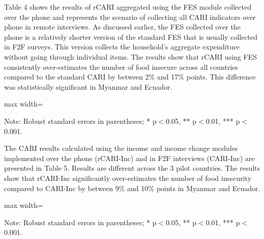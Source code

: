 \documentclass[11pt,harvard]{article}
\begin{document}
Table 4 shows the results of rCARI aggregated using the FES module collected over the phone and represents the scenario of collecting all CARI indicators over phone in remote interviews. As discussed earlier, the FES collected over the phone is a relatively shorter version of the standard FES that is usually collected in F2F surveys. This version collects the household's aggregate expenditure without going through individual items. 
The results show that rCARI using FES consistently over-estimates the number of food insecure across all countries compared to the standard CARI by between 2\% and 17\% points. This difference was statistically significant in Myanmar and Ecuador.


\begin{table}[htbp]
	\centering
	\begin{adjustbox}{max width=\textwidth}
		\begin{threeparttable}
			\caption{Impact of Survey Modality: CARI-FES vs. rCARI-FES}
			\scriptsize
			 
			\label{tab:CARI_FES_rCARI_Modality_All_Country}
			\begin{tablenotes}
				\item Note: Robust standard errors in parentheses; * p$<$0.05, ** p$<$0.01, *** p$<$0.001. 
			\end{tablenotes}
		\end{threeparttable}
	\end{adjustbox}
\end{table}

The CARI results calculated using the income and income change modules implemented over the phone (rCARI-Inc) and in F2F interviews (CARI-Inc) are presented in Table 5. Results are different across the 3 pilot countries. The results show that rCARI-Inc significantly over-estimates the number of food insecurity compared to CARI-Inc by between 9\% and 10\% points in Myanmar and Ecuador. 


\begin{table}[htbp]
	\centering
	\begin{adjustbox}{max width=\textwidth}
		\begin{threeparttable}
			\caption{Impact of Survey Modality: CARI-Inc vs. rCARI-Inc}
			\scriptsize
			 
			\label{tab:Inc_CARI_rCARI_Modality_All_Country}
			\begin{tablenotes}
				\item Note: Robust standard errors in parentheses; * p$<$0.05, ** p$<$0.01, *** p$<$0.001. 
			\end{tablenotes}
		\end{threeparttable}
	\end{adjustbox}
\end{table}
\end{document}
